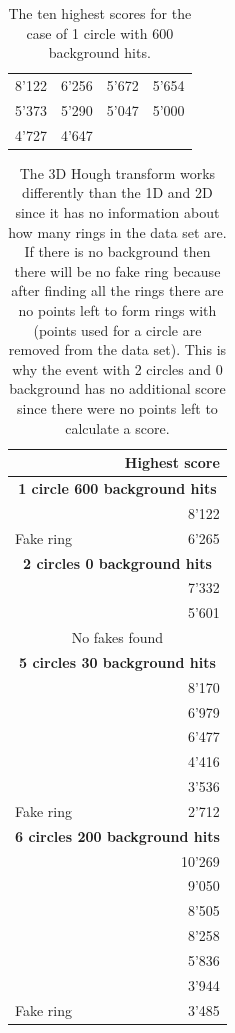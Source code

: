 \documentclass[11pt]{scrreprt}
\begin{document}
\begin{table}[ht]
\centering
\caption[Circle scores for 1 circle 600 background hits]{The ten highest scores for the case of 1 circle with 600 background hits.}
\label{tab:3d_10_high_scores}
\begin{tabular}{c|c|c|c}
\toprule
8'122 & 6'256 & 5'672 & 5'654 \\
5'373 & 5'290 & 5'047 & 5'000 \\
4'727 & 4'647 &  &  \\
\bottomrule
\end{tabular}
\end{table}

\begin{table}[tbp]
  \caption[3D Hough transform scores]{The 3D Hough transform works differently than the 1D and 2D since it has no information about how many rings in the data set are. If there is no background then there will be no fake ring because after finding all the rings there are no points left to form rings with (points used for a circle are removed from the data set). This is why the event with 2 circles and 0 background has no additional score since there were no points left to calculate a score.}
  \label{tab:3d_scores}
  \centering

  \begin{tabular}{p{5cm}r}
  \toprule
   & \textbf{Highest score}  \\
  \midrule
  \midrule
  \multicolumn{2}{c}{\textbf{1 circle 600 background hits}} \\
  & 8'122 \\
  Fake ring & 6'265\\
  \midrule
  \multicolumn{2}{c}{\textbf{2 circles 0 background hits}}\\
   & 7'332 \\
   & 5'601 \\
   \multicolumn{2}{c}{No fakes found}\\
  \midrule
  \multicolumn{2}{c}{\textbf{5 circles 30 background hits}}\\
  & 8'170 \\
  & 6'979 \\
  & 6'477 \\
  & 4'416 \\
  & 3'536 \\
  Fake ring & 2'712 \\
  \midrule
  \multicolumn{2}{c}{\textbf{6 circles 200 background hits}}\\
  & 10'269 \\
  & 9'050 \\
  & 8'505 \\
  & 8'258 \\
  & 5'836 \\
  & 3'944 \\
  Fake ring & 3'485 \\
   \bottomrule
  \end{tabular}
\end{table}
\end{document}

